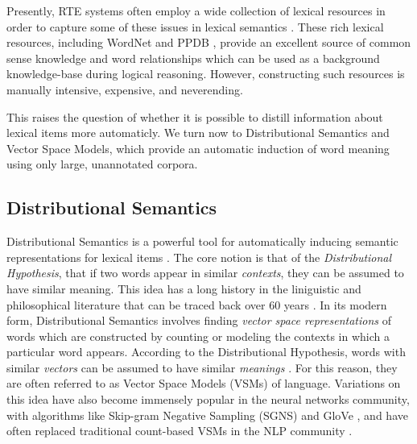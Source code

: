 \documentclass[12pt]{article}
\begin{document}
Presently, RTE systems often employ a wide collection of lexical resources in
order to capture some of these issues in lexical semantics
\cite{maccartney:2008:coling,bjerva:2014:semeval,beltagy:2016:cl}. These
rich lexical resources, including WordNet \cite{miller:1995:acm} and PPDB
\cite{ganitkevitch:2013:naacl}, provide an excellent
source of common sense knowledge and word relationships which can be used as a
background knowledge-base during logical reasoning. However, constructing
such resources is manually intensive, expensive, and neverending.

This raises the question of whether it is possible to distill
information about lexical items more automaticly. We turn now to
Distributional Semantics and Vector Space Models, which provide an automatic
induction of word meaning using only large, unannotated corpora.

\subsection{Distributional Semantics}
\label{sec:dist}

Distributional Semantics is a powerful tool for automatically inducing semantic
representations for lexical items \cite{turney:2010:jair,erk:2012:llc}.  The
core notion is that of the {\em Distributional Hypothesis}, that if two words
appear in similar {\em contexts}, they can be assumed to have similar meaning.
This idea has a long history in the liniguistic and philosophical literature that
can be traced back over 60 years
\cite{wittgenstein:1953:pi,harris:1954:word,firth:1957:la}. In its modern form,
Distributional Semantics involves finding {\em vector space representations} of
words which are constructed by counting or modeling the contexts in which a
particular word appears. According to the Distributional Hypothesis, words
with similar {\em vectors} can be assumed to have similar {\em meanings}
\cite{turney:2010:jair}. For this reason, they are often referred to as
Vector Space Models (VSMs) of language. Variations on this idea have also
become immensely popular in the neural networks community, with algorithms
like Skip-gram Negative Sampling (SGNS) \cite{mikolov:2013:iclr} and GloVe
\cite{pennington:2014:emnlp}, and have often replaced traditional count-based
VSMs in the NLP community \cite{baroni:2014:acl}.
\end{document}
